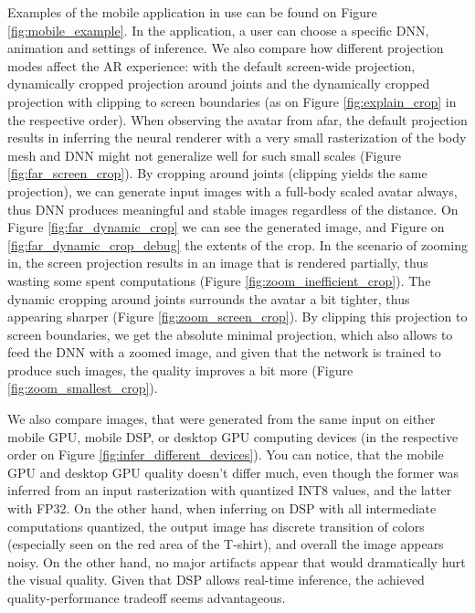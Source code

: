 Examples of the mobile application in use can be found on Figure \ref{fig:mobile_example}. In the application, a user can choose a specific DNN, animation and settings of inference. We also compare how different projection modes affect the AR experience: with the default screen-wide projection, dynamically cropped projection around joints and the dynamically cropped projection with clipping to screen boundaries (as on Figure \ref{fig:explain_crop} in the respective order). When observing the avatar from afar, the default projection results in inferring the neural renderer with a very small rasterization of the body mesh and DNN might not generalize well for such small scales (Figure \ref{fig:far_screen_crop}). By cropping around joints (clipping yields the same projection), we can generate input images with a full-body scaled avatar always, thus DNN produces meaningful and stable images regardless of the distance. On Figure \ref{fig:far_dynamic_crop} we can see the generated image, and Figure on \ref{fig:far_dynamic_crop_debug} the extents of the crop. In the scenario of zooming in, the screen projection results in an image that is rendered partially, thus wasting some spent computations (Figure \ref{fig:zoom_inefficient_crop}). The dynamic cropping around joints surrounds the avatar a bit tighter, thus appearing sharper (Figure \ref{fig:zoom_screen_crop}). By clipping this projection to screen boundaries, we get the absolute minimal projection, which also allows to feed the DNN with a zoomed image, and given  that the network is trained to produce such images, the quality improves a bit more (Figure \ref{fig:zoom_smallest_crop}).

We also compare images, that were generated from the same input on either mobile GPU, mobile DSP, or desktop GPU computing devices (in the respective order on Figure \ref{fig:infer_different_devices}). You can notice, that the mobile GPU and desktop GPU quality doesn't differ much, even though the former was inferred from an input rasterization with quantized INT8 values, and the latter with FP32. On the other hand, when inferring on DSP with all intermediate computations quantized, the output image has discrete transition of colors (especially seen on the red area of the T-shirt), and overall the image appears noisy. On the other hand, no major artifacts appear that would dramatically hurt the visual quality. Given that DSP allows real-time inference, the achieved quality-performance tradeoff seems advantageous.

